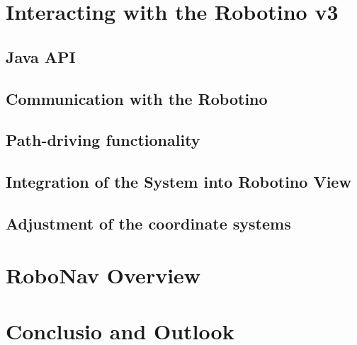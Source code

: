 \documentclass[12pt]{article}
\begin{document}
\newpage %
\section{Interacting with the Robotino v3}
\label{sec:robotinov3}
%

\subsection{Java API}
\label{subsec:robotinojavaapi}
%

\subsection{Communication with the Robotino}
\label{subsec:communicationRobotino}
%

 \subsection{Path-driving functionality}
\label{subsec:pathrivingr3}


\subsection{Integration of the System into Robotino View}
\label{subsec:robotinoview}
%

\newpage %
\subsection{Adjustment of the coordinate systems}
\label{subsec:coordinatesystems}
%


\newpage %
\section{RoboNav Overview}
\label{sec:gui}


\newpage %
\section{Conclusio and Outlook}
\label{sec:conclusio}

\newpage %
\cfoot{}
\end{document}
